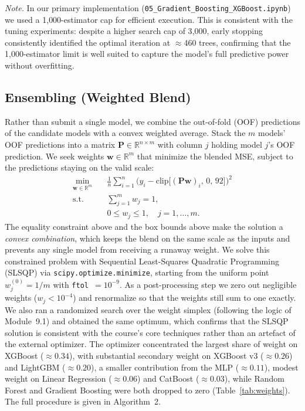 \documentclass[journal]{IEEEtran}
\begin{document}
\noindent\emph{Note.} In our primary implementation
(\texttt{05\_Gradient\_Boosting\_XGBoost.ipynb}) we used a 1{,}000-estimator cap
for efficient execution. This is consistent with the tuning experiments: despite
a higher search cap of 3{,}000, early stopping consistently identified the
optimal iteration at $\approx$460 trees, confirming that the 1{,}000-estimator
limit is well suited to capture the model's full predictive power without
overfitting.

\subsection{Ensembling (Weighted Blend)}
\label{sec:blend}
Rather than submit a single model, we combine the out-of-fold (OOF) predictions
of the candidate models with a convex weighted average. Stack the $m$ models'
OOF predictions into a matrix $\mathbf{P}\in\mathbb{R}^{n\times m}$ with column
$j$ holding model $j$'s OOF prediction. We seek weights
$\mathbf{w}\in\mathbb{R}^{m}$ that minimize the blended MSE, subject to the
predictions staying on the valid scale:
\begin{align}
\min_{\mathbf{w}\in\mathbb{R}^{m}}\quad
& \frac{1}{n}\sum_{i=1}^{n}\Big(y_i-\mathrm{clip}\big[(\mathbf{P}\mathbf{w})_i,\,0,\,92\big]\Big)^{2}
\label{eq:blendobj}\\
\text{s.t.}\quad & \sum_{j=1}^{m}w_j = 1,
\label{eq:blendeq}\\
& 0 \le w_j \le 1,\quad j=1,\dots,m.
\label{eq:blendbox}
\end{align}
The equality constraint above and the box
bounds above make the solution a \emph{convex combination}, which
keeps the blend on the same scale as the inputs and prevents any single model
from receiving a runaway weight. We solve this constrained problem
with Sequential Least-Squares Quadratic Programming (SLSQP) via
\texttt{scipy.optimize.minimize}, starting from the uniform point
$w_j^{(0)}=1/m$ with \texttt{ftol}~$=10^{-9}$. As a post-processing step we zero
out negligible weights ($w_j<10^{-4}$) and renormalize so that
the weights still sum to one exactly. We also ran a randomized search over the
weight simplex (following the logic of Module~9.1) and obtained the same optimum,
which confirms that the SLSQP solution is consistent with the course's core
techniques rather than an artefact of the external optimizer. The optimizer
concentrated the largest share of weight on XGBoost ($\approx0.34$), with
substantial secondary weight on XGBoost v3 ($\approx0.26$) and LightGBM
($\approx0.20$), a smaller contribution from the MLP ($\approx0.11$), modest
weight on Linear Regression ($\approx0.06$) and CatBoost ($\approx0.03$), while
Random Forest and Gradient Boosting were both dropped to zero
(Table~\ref{tab:weights}). The full procedure is given in Algorithm~2.
\end{document}
